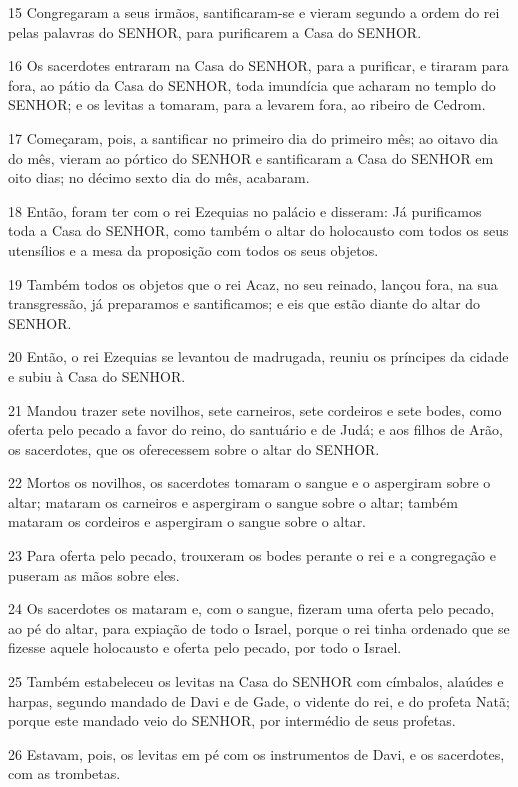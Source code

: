 \par 15 Congregaram a seus irmãos, santificaram-se e vieram segundo a ordem do rei pelas palavras do SENHOR, para purificarem a Casa do SENHOR.
\par 16 Os sacerdotes entraram na Casa do SENHOR, para a purificar, e tiraram para fora, ao pátio da Casa do SENHOR, toda imundícia que acharam no templo do SENHOR; e os levitas a tomaram, para a levarem fora, ao ribeiro de Cedrom.
\par 17 Começaram, pois, a santificar no primeiro dia do primeiro mês; ao oitavo dia do mês, vieram ao pórtico do SENHOR e santificaram a Casa do SENHOR em oito dias; no décimo sexto dia do mês, acabaram.
\par 18 Então, foram ter com o rei Ezequias no palácio e disseram: Já purificamos toda a Casa do SENHOR, como também o altar do holocausto com todos os seus utensílios e a mesa da proposição com todos os seus objetos.
\par 19 Também todos os objetos que o rei Acaz, no seu reinado, lançou fora, na sua transgressão, já preparamos e santificamos; e eis que estão diante do altar do SENHOR.
\par 20 Então, o rei Ezequias se levantou de madrugada, reuniu os príncipes da cidade e subiu à Casa do SENHOR.
\par 21 Mandou trazer sete novilhos, sete carneiros, sete cordeiros e sete bodes, como oferta pelo pecado a favor do reino, do santuário e de Judá; e aos filhos de Arão, os sacerdotes, que os oferecessem sobre o altar do SENHOR.
\par 22 Mortos os novilhos, os sacerdotes tomaram o sangue e o aspergiram sobre o altar; mataram os carneiros e aspergiram o sangue sobre o altar; também mataram os cordeiros e aspergiram o sangue sobre o altar.
\par 23 Para oferta pelo pecado, trouxeram os bodes perante o rei e a congregação e puseram as mãos sobre eles.
\par 24 Os sacerdotes os mataram e, com o sangue, fizeram uma oferta pelo pecado, ao pé do altar, para expiação de todo o Israel, porque o rei tinha ordenado que se fizesse aquele holocausto e oferta pelo pecado, por todo o Israel.
\par 25 Também estabeleceu os levitas na Casa do SENHOR com címbalos, alaúdes e harpas, segundo mandado de Davi e de Gade, o vidente do rei, e do profeta Natã; porque este mandado veio do SENHOR, por intermédio de seus profetas.
\par 26 Estavam, pois, os levitas em pé com os instrumentos de Davi, e os sacerdotes, com as trombetas.
